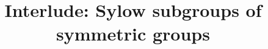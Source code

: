 \documentclass{ximera}
\title{Interlude: Sylow subgroups of symmetric groups}
\begin{document}
\begin{abstract}

\end{abstract}
\maketitle

\end{document}
